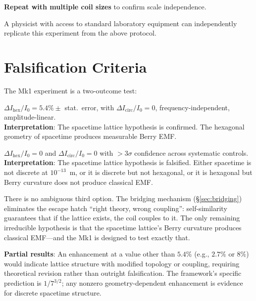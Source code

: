 \documentclass[12pt,a4paper]{article}
\theoremstyle{plain}
\theoremstyle{definition}
\begin{document}
\textbf{Repeat with multiple coil sizes} to confirm scale independence.

A physicist with access to standard laboratory equipment can independently replicate this experiment from the above protocol.

\section{Falsification Criteria}\label{sec:falsify}

The Mk1 experiment is a two-outcome test:

\begin{tcolorbox}[colback=green!3!white, colframe=green!50!black, title=\textbf{Positive Result}]
$\Delta I_{\mathrm{hex}}/I_0 = 5.4\% \pm$ stat.\ error, with $\Delta I_{\mathrm{circ}}/I_0 = 0$, frequency-independent, amplitude-linear. \\
\textbf{Interpretation}: The spacetime lattice hypothesis is confirmed. The hexagonal geometry of spacetime produces measurable Berry EMF.
\end{tcolorbox}

\begin{tcolorbox}[colback=red!3!white, colframe=red!50!black, title=\textbf{Null Result}]
$\Delta I_{\mathrm{hex}}/I_0 = 0$ and $\Delta I_{\mathrm{circ}}/I_0 = 0$ with $>3\sigma$ confidence across systematic controls. \\
\textbf{Interpretation}: The spacetime lattice hypothesis is falsified. Either spacetime is not discrete at $10^{-13}$~m, or it is discrete but not hexagonal, or it is hexagonal but Berry curvature does not produce classical EMF.
\end{tcolorbox}

There is no ambiguous third option. The bridging mechanism (\S\ref{sec:bridging}) eliminates the escape hatch ``right theory, wrong coupling'': self-similarity guarantees that if the lattice exists, the coil couples to it. The only remaining irreducible hypothesis is that the spacetime lattice's Berry curvature produces classical EMF---and the Mk1 is designed to test exactly that.

\textbf{Partial results}: An enhancement at a value other than $5.4\%$ (e.g., $2.7\%$ or $8\%$) would indicate lattice structure with modified topology or coupling, requiring theoretical revision rather than outright falsification. The framework's specific prediction is $1/7^{3/2}$; any nonzero geometry-dependent enhancement is evidence for discrete spacetime structure.
\end{document}
